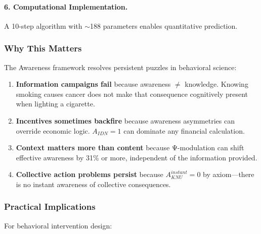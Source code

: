 \paragraph{6. Computational Implementation.}
A 10-step algorithm with $\sim$188 parameters enables quantitative prediction.

\subsubsection{Why This Matters}

The Awareness framework resolves persistent puzzles in behavioral science:

\begin{enumerate}
    \item \textbf{Information campaigns fail} because awareness $\neq$ knowledge. 
          Knowing smoking causes cancer does not make that consequence 
          cognitively present when lighting a cigarette.
    
    \item \textbf{Incentives sometimes backfire} because awareness asymmetries 
          can override economic logic. $A_{IDN} = 1$ can dominate any 
          financial calculation.
    
    \item \textbf{Context matters more than content} because Ψ-modulation 
          can shift effective awareness by 31\% or more, independent of 
          the information provided.
    
    \item \textbf{Collective action problems persist} because 
          $A_{KNU}^{instant} = 0$ by axiom—there is no instant awareness 
          of collective consequences.
\end{enumerate}

\subsubsection{Practical Implications}

For behavioral intervention design:

